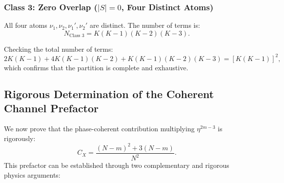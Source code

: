 \documentclass[11pt,a4paper]{article}
\begin{document}
\subsubsection{Class 3: Zero Overlap ($|S| = 0$, Four Distinct Atoms)}
All four atoms $\nu_1, \nu_2, \nu_1', \nu_2'$ are distinct. The number of terms is:
\begin{equation}
    N_{\text{Class 3}} = K(K - 1)(K - 2)(K - 3).
\end{equation}

Checking the total number of terms:
\begin{equation}
    2K(K - 1) + 4K(K - 1)(K - 2) + K(K - 1)(K - 2)(K - 3) = [K(K - 1)]^2,
\end{equation}
which confirms that the partition is complete and exhaustive.

\subsection{Rigorous Determination of the Coherent Channel Prefactor}
We now prove that the phase-coherent contribution multiplying $\eta^{2m - 3}$ is rigorously:
\begin{equation}
    C_X = \frac{(N - m)^2 + 3(N - m)}{N^2}.
\end{equation}
This prefactor can be established through two complementary and rigorous physics arguments:
\end{document}
